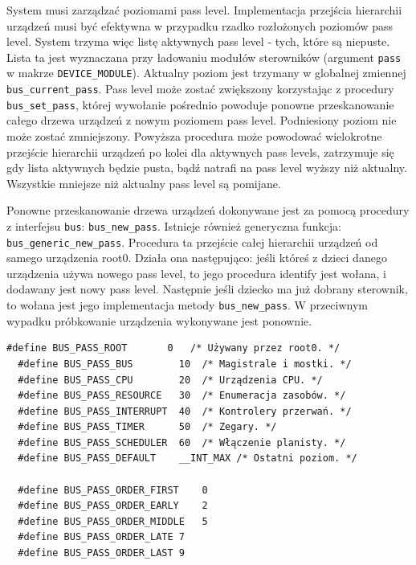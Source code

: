 \documentclass[shortabstract,inz]{iithesis}
\begin{document}
System musi zarządzać poziomami pass level. Implementacja przejścia hierarchii
urządzeń musi być efektywna w przypadku rzadko rozłożonych poziomów pass level.
System trzyma więc listę aktywnych pass level - tych, które są niepuste.
Lista ta jest wyznaczana przy ładowaniu modułów sterowników (argument \texttt{pass} w makrze \texttt{DEVICE\_MODULE}). 
\newline
Aktualny poziom jest trzymany w globalnej zmiennej \texttt{bus\_current\_pass}.
Pass level może zostać zwiększony korzystając z procedury \texttt{bus\_set\_pass},
której wywołanie pośrednio powoduje ponowne przeskanowanie całego drzewa urządzeń z nowym poziomem pass level.
Podniesiony poziom nie może zostać zmniejszony. Powyższa procedura może powodować wielokrotne przejście
hierarchii urządzeń po kolei dla aktywnych pass levels, zatrzymuje się gdy lista aktywnych
będzie pusta, bądź natrafi na pass level wyższy niż aktualny. Wszystkie mniejsze niż
aktualny pass level są pomijane.

Ponowne przeskanowanie drzewa urządzeń dokonywane jest za pomocą procedury z interfejsu \texttt{bus}:
\texttt{bus\_new\_pass}. Istnieje również generyczna funkcja:\\\texttt{bus\_generic\_new\_pass}.
Procedura ta przejście całej hierarchii urządzeń od samego urządzenia root0.
Działa ona następująco: jeśli któreś z dzieci danego urządzenia używa nowego pass level, to
jego procedura identify jest wołana, i dodawany jest nowy pass level. Następnie jeśli
dziecko ma już dobrany sterownik, to wołana jest jego implementacja metody \texttt{bus\_new\_pass}.
W przeciwnym wypadku próbkowanie urządzenia wykonywane jest ponownie.


\begin{lstlisting}[caption=Poziomy pass level]
  #define BUS_PASS_ROOT       0   /* Używany przez root0. */
  #define BUS_PASS_BUS        10  /* Magistrale i mostki. */
  #define BUS_PASS_CPU        20  /* Urządzenia CPU. */
  #define BUS_PASS_RESOURCE   30  /* Enumeracja zasobów. */
  #define BUS_PASS_INTERRUPT  40  /* Kontrolery przerwań. */
  #define BUS_PASS_TIMER      50  /* Zegary. */
  #define BUS_PASS_SCHEDULER  60  /* Włączenie planisty. */
  #define BUS_PASS_DEFAULT    __INT_MAX /* Ostatni poziom. */
  
  #define BUS_PASS_ORDER_FIRST    0
  #define BUS_PASS_ORDER_EARLY    2
  #define BUS_PASS_ORDER_MIDDLE   5
  #define BUS_PASS_ORDER_LATE 7
  #define BUS_PASS_ORDER_LAST 9
\end{lstlisting}
\end{document}
